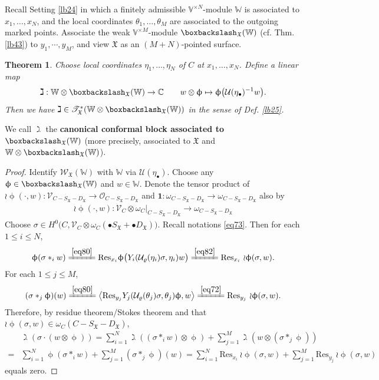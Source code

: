 \documentclass[11pt,b5paper,notitlepage]{article}
\theoremstyle{definition}
\theoremstyle{plain}
\newtheorem{thm}[df]{Theorem}
\newcommand{\fk}{\mathfrak}
\newcommand{\mc}{\mathcal}
\newcommand{\idt}{\mathbf{1}}
\newcommand{\Res}{\mathrm{Res}}
\newcommand{\SV}{\mathscr{V}}
\newcommand{\scr}{\mathscr}
\newcommand{\SX}{{S_{\fk X}}}
\newcommand{\DX}{D_{\fk X}}
\newcommand{\blt}{\bullet}
\newcommand{\Vbb}{\mathbb V}
\newcommand{\Wbb}{\mathbb W}
\newcommand{\Cbb}{\mathbb C}
\newcommand{\<}{\left\langle}
\renewcommand{\>}{\right\rangle}
\newcommand{\fx}{\mathfrak{X}}
\newcommand{\ST}{\mathscr{T}}
\newcommand{\bbs}{\boxbackslash}
\numberwithin{equation}{section}
\begin{document}
Recall Setting \ref{lb24} in which a finitely admissible $\Vbb^{\times N}$-module $\Wbb$ is associated to $x_1,\dots,x_N$, and the local coordinates $\theta_1,\dots,\theta_M$ are associated to the outgoing marked points. Associate the weak $\Vbb^{\times M}$-module $\boxbackslash_\fx(\Wbb)$ (cf. Thm. \ref{lb43}) to $y_1,\cdots,y_M$, and view $\fk X$ as an $(M+N)$-pointed surface. 




\begin{thm}\label{lb26}
Choose local coordinates $\eta_1,\dots,\eta_N$ of $C$ at $x_1,\dots,x_N$.  Define a linear map
    \begin{gather}\label{eq79}
\gimel:\Wbb\otimes \boxbackslash_\fx(\Wbb)\rightarrow \Cbb\qquad
        w\otimes \upphi\mapsto \upphi\big(\mc U(\eta_\blt)^{-1}w\big).
    \end{gather}
Then we have $\gimel\in \ST_\fx^*(\Wbb\otimes \boxbackslash_\fx(\Wbb))$ in the sense of Def. \ref{lb25}.
\end{thm}

We call $\gimel$ the \textbf{canonical conformal block associated to $\bbs_{\fk X}(\Wbb)$} (more precisely, associated to $\fk X$ and $\Wbb\otimes\bbs_\fx(\Wbb)$).

\begin{proof}
Identify $\scr W_{\fk X}(\Wbb)$ with $\Wbb$ via $\mc U(\eta_\blt)$.   Choose any $\upphi\in \boxbackslash_\fx(\Wbb)$ and $w\in \Wbb$. Denote the tensor product of $\wr \upphi(\cdot,w):\scr V_{C-\SX-\DX}\rightarrow \mc O_{C-\SX-\DX}$ and $\idt:\omega_{C-\SX-\DX}\rightarrow\omega_{C-\SX-\DX}$ also by
\begin{align*}
\wr\upphi(\cdot,w):\scr V_C\otimes\omega_C|_{C-\SX-\DX}\rightarrow\omega_{C-\SX-\DX}
\end{align*}
Choose $\sigma\in H^0\big(C,\SV_C\otimes \omega_C(\bullet S_\fx+\bullet D_\fx)\big)$. Recall notations \eqref{eq73}. Then for each $1\leq i\leq N$,
\begin{align}
\upphi(\sigma*_i w)\xlongequal{\eqref{eq80}} \Res_{x_i}\upphi\big(Y_i(\mc U_\varrho(\eta_i)\sigma,\eta_i)w \big)\xlongequal{\eqref{eq82}} \Res_{x_i}~{\wr\upphi}(\sigma,w).    \label{eq123}
\end{align}
For each  $1\leq j\leq M$,
\begin{align}
(\sigma*_j\upphi)(w)\xlongequal{\eqref{eq80}} \<\Res_{y_j} Y_j(\mc U_\varrho(\theta_j)\sigma,\theta_j)\upphi,w\>  \xlongequal{\eqref{eq72}} \Res_{y_j}~{\wr\upphi}(\sigma,w).   \label{eq124}
\end{align}
Therefore, by residue theorem/Stokes theorem and that $\wr\upphi(\sigma,w)\in \omega_C(C-\SX-\DX)$,
\begin{align*}
&\gimel(\sigma\cdot(w\otimes\upphi))=\sum_{i=1}^N\gimel((\sigma*_i w)\otimes\upphi)+\sum_{j=1}^M\gimel(w\otimes (\sigma*_j\upphi))\\
=&\sum_{i=1}^N\upphi(\sigma*_i w)+\sum_{j=1}^M (\sigma*_j\upphi)(w)=\sum_{i=1}^N \Res_{x_i}~{\wr\upphi}(\sigma,w)+\sum_{j=1}^M\Res_{y_j}~{\wr\upphi}(\sigma,w)
\end{align*}
equals zero.
\end{proof}
\end{document}
